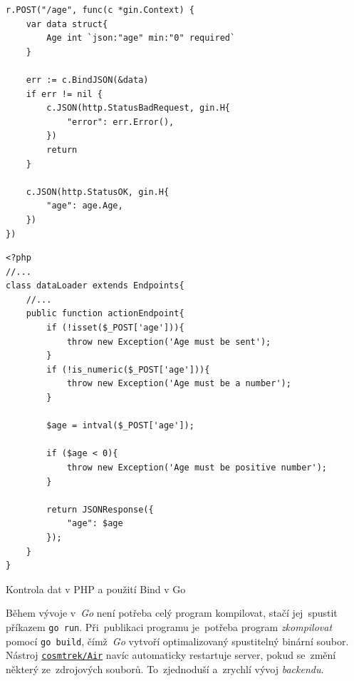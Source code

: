 \documentclass[11pt,a4paper]{report}
\begin{document}
            \begin{code}
                \begin{minipage}[t]{0.48\linewidth}
                    \begin{verbatim}
r.POST("/age", func(c *gin.Context) {
    var data struct{
        Age int `json:"age" min:"0" required`
    }

    err := c.BindJSON(&data)
    if err != nil {
        c.JSON(http.StatusBadRequest, gin.H{
            "error": err.Error(),
        })
        return
    }

    c.JSON(http.StatusOK, gin.H{
        "age": age.Age,
    })
})
                    \end{verbatim}
                \end{minipage}
                \hfill
                \begin{minipage}[t]{0.48\linewidth}
                    \begin{verbatim}
<?php
//...
class dataLoader extends Endpoints{
    //...
    public function actionEndpoint{
        if (!isset($_POST['age'])){
            throw new Exception('Age must be sent');
        }
        if (!is_numeric($_POST['age'])){
            throw new Exception('Age must be a number');
        }

        $age = intval($_POST['age']);

        if ($age < 0){
            throw new Exception('Age must be positive number');
        }

        return JSONResponse({
            "age": $age
        });
    }
}

                    \end{verbatim}
                \end{minipage}
                \caption{Kontrola dat v PHP a použití Bind v Go}
                \label{go:structuretags}
            \end{code}

            Během vývoje v~\emph{Go} není potřeba celý program kompilovat, stačí jej~spustit příkazem \texttt{go run}. Při~publikaci programu je~potřeba program \emph{zkompilovat} pomocí \texttt{go build}, čímž~\emph{Go} vytvoří optimalizovaný spustitelný binární soubor. Nástroj \href{https://github.com/cosmtrek/air}{\texttt{cosmtrek/Air}} navíc automaticky restartuje server, pokud se~změní některý ze~zdrojových souborů. To~zjednoduší a~zrychlí vývoj \emph{backendu}.
            
\end{document}
